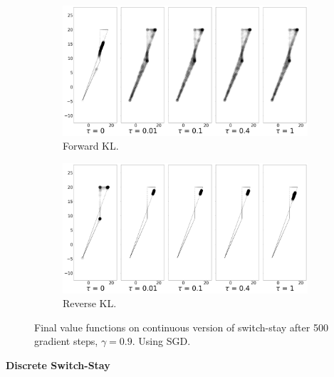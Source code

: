 \documentclass{article}
\begin{document}
\begin{figure}[!htb]
  \centering
  \begin{subfigure}[b]{0.5\linewidth}
    \centering
    \includegraphics[width=0.8\columnwidth]{figs/continuous-switch-stay/notlearnQ/polytope_forward_optim=sgd_lr=0.005.png}
    \caption{Forward KL.}
    \label{fig:cont-switch-stay-forward-sgd}
  \end{subfigure}%
  \begin{subfigure}[b]{0.5\linewidth}
        \centering
        \includegraphics[width=0.8\columnwidth]{figs/continuous-switch-stay/notlearnQ/polytope_reverse_optim=sgd_lr=0.005.png}
        \caption{Reverse KL.}
        \label{fig:cont-switch-stay-reverse-sgd}
  \end{subfigure}
  \caption{Final value functions on continuous version of switch-stay after 500 gradient steps, $\gamma = 0.9$. Using SGD.}
\end{figure}

\clearpage 
\textbf{Discrete Switch-Stay}
\end{document}
